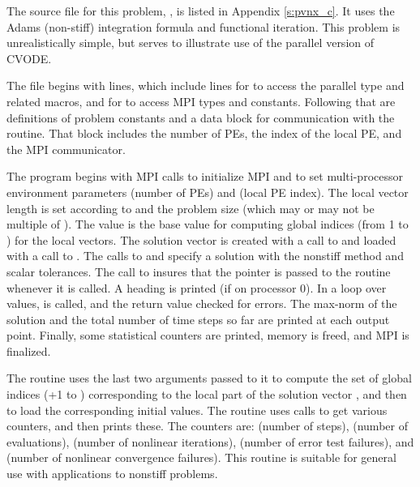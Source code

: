The source file for this problem, , is listed in Appendix
\ref{s:pvnx_c}.  It uses the Adams (non-stiff) integration formula and
functional iteration.  This problem is unrealistically simple, but
serves to illustrate use of the parallel version of CVODE.

The  file begins with  lines, which include lines for
 to access the parallel  type and related
macros, and for  to access MPI types and constants. Following
that are definitions of problem constants and a data block for communication
with the  routine.  That block includes the number of PEs, the index
of the local PE, and the MPI communicator.

The  program begins with MPI calls to initialize MPI and to set
multi-processor environment parameters  (number of PEs) and
 (local PE index).  The local vector length is set according
to  and the problem size  (which may or may not be
multiple of ).  The value  is the base value for
computing global indices (from 1 to ) for the local vectors.
The solution vector  is created with a call to 
and loaded with a call to .  The calls to 
and  specify a {\cvode} solution with the nonstiff method
and scalar tolerances.  The call to  insures that the
pointer  is passed to the  routine whenever it is called.
A heading is printed (if on processor 0).  In a loop over  values,
 is called, and the return value checked for errors.  The
max-norm of the solution and the total number of time steps so far
are printed at each output point.  Finally, some statistical counters are
printed, memory is freed, and MPI is finalized.

The  routine uses the last two arguments passed to it to compute
the set of global indices (+1 to )
corresponding to the local part of the solution vector , and then to
load the corresponding initial values.  The  routine
uses  calls to get various counters, and then prints these.
The counters are:  (number of steps),  (number of
 evaluations),  (number of nonlinear iterations),
 (number of error test failures), and  (number of
nonlinear convergence failures).  This routine is suitable for general use
with {\cvode} applications to nonstiff problems.

